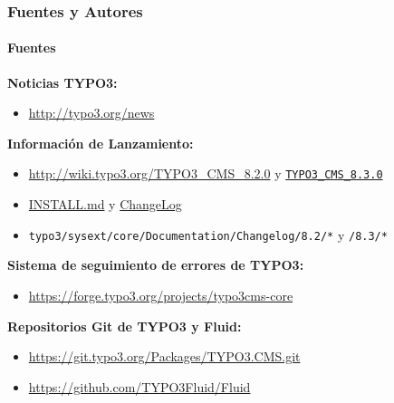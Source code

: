 \begin{frame}[fragile]
	\frametitle{Fuentes y Autores}
	\framesubtitle{Fuentes}

	\textbf{Noticias TYPO3:}
		\begin{itemize}\smaller
			\item \url{http://typo3.org/news}
		\end{itemize}

	\textbf{Información de Lanzamiento:}
		\begin{itemize}\smaller
			\item \url{http://wiki.typo3.org/TYPO3_CMS_8.2.0} y \texttt{\href{http://wiki.typo3.org/TYPO3_CMS_8.3.0}{TYPO3\_CMS\_8.3.0}}
			\item \href{https://github.com/TYPO3/TYPO3.CMS/blob/master/INSTALL.md}{INSTALL.md}
				y \href{https://github.com/TYPO3/TYPO3.CMS/tree/master/typo3/sysext/core/Documentation/Changelog}{ChangeLog}
			\item \texttt{typo3/sysext/core/Documentation/Changelog/8.2/*} y \texttt{/8.3/*}
		\end{itemize}

	\textbf{Sistema de seguimiento de errores de TYPO3:}
		\begin{itemize}\smaller
			\item \url{https://forge.typo3.org/projects/typo3cms-core}
		\end{itemize}

	\textbf{Repositorios Git de TYPO3 y Fluid:}
		\begin{itemize}\smaller
			\item \url{https://git.typo3.org/Packages/TYPO3.CMS.git}
			\item \url{https://github.com/TYPO3Fluid/Fluid}
		\end{itemize}

\end{frame}


